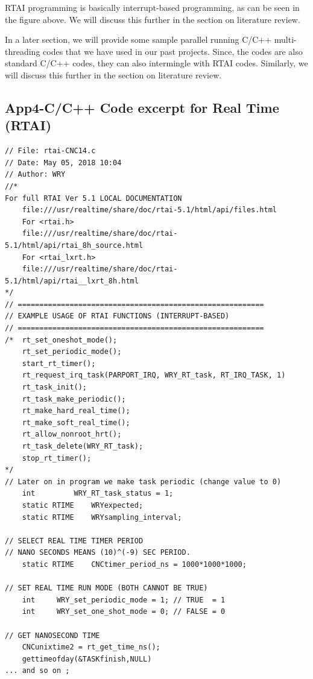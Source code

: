 RTAI programming is basically interrupt-based programming, as can be seen in the figure above. We will discuss this further in the section on literature review.
\vspace*{1\baselineskip}

In a later section, we will provide some sample parallel running C/C++ multi-threading codes that we have used in our past projects. Since, the codes are also standard C/C++ codes, they can also intermingle with RTAI codes. Similarly, we will discuss this further in the section on literature review.

\pagebreak

\subsection{App4-C/C++ Code excerpt for Real Time (RTAI)}


\begin{lstlisting}[caption={C/C++ Code excerpt for Real Time (RTAI)}, label=AC/C++ Code excerpt for Real Time (RTAI)]
// File: rtai-CNC14.c
// Date: May 05, 2018 10:04
// Author: WRY
//*
For full RTAI Ver 5.1 LOCAL DOCUMENTATION
	file:///usr/realtime/share/doc/rtai-5.1/html/api/files.html
	For <rtai.h>
	file:///usr/realtime/share/doc/rtai-5.1/html/api/rtai_8h_source.html
	For <rtai_lxrt.h>
	file:///usr/realtime/share/doc/rtai-5.1/html/api/rtai__lxrt_8h.html
*/
// =========================================================
// EXAMPLE USAGE OF RTAI FUNCTIONS (INTERRUPT-BASED)
// ========================================================= 
/*	rt_set_oneshot_mode();
	rt_set_periodic_mode();
	start_rt_timer();
	rt_request_irq_task(PARPORT_IRQ, WRY_RT_task, RT_IRQ_TASK, 1)
	rt_task_init(); 
	rt_task_make_periodic(); 
	rt_make_hard_real_time();
	rt_make_soft_real_time();
	rt_allow_nonroot_hrt();
	rt_task_delete(WRY_RT_task);
	stop_rt_timer();
*/
// Later on in program we make task periodic (change value to 0)
	int 		WRY_RT_task_status = 1;  
	static RTIME 	WRYexpected;
	static RTIME 	WRYsampling_interval;	

// SELECT REAL TIME TIMER PERIOD
// NANO SECONDS MEANS (10)^(-9) SEC PERIOD.
	static RTIME 	CNCtimer_period_ns = 1000*1000*1000; 

// SET REAL TIME RUN MODE (BOTH CANNOT BE TRUE)
	int 	WRY_set_periodic_mode = 1; // TRUE  = 1 
	int		WRY_set_one_shot_mode = 0; // FALSE = 0

// GET NANOSECOND TIME
	CNCunixtime2 = rt_get_time_ns(); 
	gettimeofday(&TASKfinish,NULL)
... and so on ;
\end{lstlisting}


